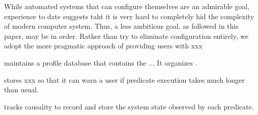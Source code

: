 While automated systems that can configure themselves are an admirable goal, experience
to date suggests taht it is very hard to completely hid the complexity
of modern computer system. Thus, a less ambitious goal, as followed in this paper,
may be in order. Rather than try to eliminate configuration entirely, we adopt the
more pragmatic approach of providing users with xxx

\ourtool maintains a profile database that contains the ... It organizes .

\ourtool stores xxx so that it can warn a user if predicate execution takes
much longer than usual. 

\ourtool tracks causality to record and store the system state observed by
each predicate.
